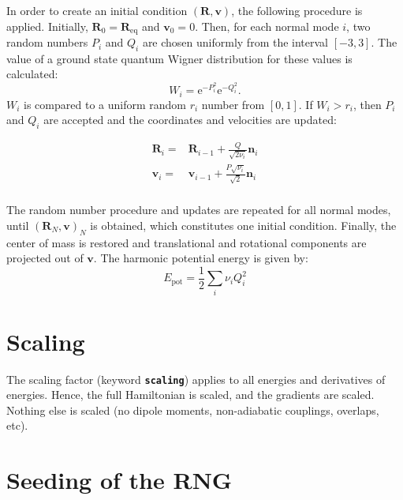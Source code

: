 \documentclass[a4paper,11pt,DIV=15,openany,twoside=false]{scrbook}
\newcommand{\ttmdump}[1]{#1}
\newcommand{\ttt}[1]{\textbf{\texttt{#1}}}
\newcommand{\E}{\ensuremath{\mathrm{e}}}
\newcommand{\VEC}[1]{\ensuremath{\mathbf{#1}}}
\begin{document}
In order to create an initial condition $(\VEC{R},\VEC{v})$, the following procedure is applied. Initially, $\VEC{R}_0=\VEC{R}_{\text{eq}}$ and $\VEC{v}_0=0$. Then, for each normal mode $i$, two random numbers $P_i$ and $Q_i$ are chosen uniformly from the interval $[-3,3]$. The value of a ground state quantum Wigner distribution for these values is calculated:
\begin{equation}
  W_i=\E^{-P_i^2}\E^{-Q_i^2}.
\end{equation}
$W_i$ is compared to a uniform random $r_i$ number from $[0,1]$. If $W_i>r_i$, then $P_i$ and $Q_i$ are accepted and the coordinates and velocities are updated:
\ttmdump{
  \begin{align}
    \VEC{R}_i=&\VEC{R}_{i-1} + \frac{Q}{\sqrt{2\nu_i}}\VEC{n}_i\\
    \VEC{v}_i=&\VEC{v}_{i-1} + \frac{P\sqrt{\nu_i}}{\sqrt{2}}\VEC{n}_i\\
  \end{align}
}
The random number procedure and updates are repeated for all normal modes, until $(\VEC{R}_N,\VEC{v})_N$ is obtained, which constitutes one initial condition. Finally, the center of mass is restored and translational and rotational components are projected out of $\VEC{v}$. The harmonic potential energy is given by:
\begin{equation}
  E_{\text{pot}}=\frac{1}{2}\sum\limits_i \nu_iQ_i^2
\end{equation}


\section{Scaling}\label{met:scaling}

The scaling factor (keyword \ttt{scaling}) applies to all energies and derivatives of energies. Hence, the full Hamiltonian is scaled, and the gradients are scaled. Nothing else is scaled (no dipole moments, non-adiabatic couplings, overlaps, etc).


\section{Seeding of the RNG}\label{met:seed}
\end{document}
